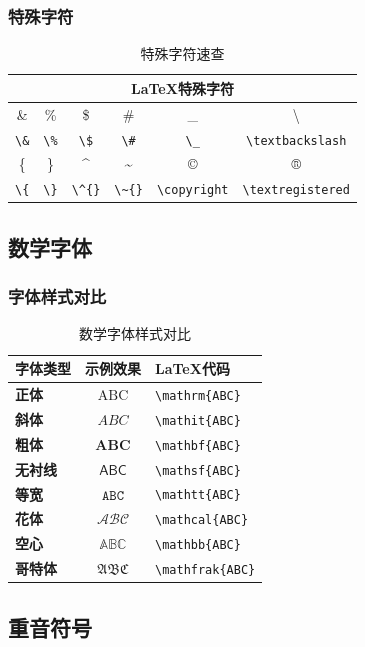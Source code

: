 \documentclass{article}
\begin{document}
\subsubsection{特殊字符}
\begin{table}[H]
\small
\centering
\begin{tabular}{*{6}{c}}
\hline
\multicolumn{6}{c}{\textbf{LaTeX特殊字符}} \\
\hline
\& & \% & \$ & \# & \_ & \textbackslash \\
\verb|\&| & \verb|\%| & \verb|\$| & \verb|\#| & \verb|\_| & \verb|\textbackslash| \\
\hline
\{ & \} & \^{} & \~{} & © & ® \\
\verb|\{| & \verb|\}| & \verb|\^{}| & \verb|\~{}| & \verb|\copyright| & \verb|\textregistered| \\
\hline
\end{tabular}
\caption{特殊字符速查}
\end{table}

\subsection{数学字体}

\subsubsection{字体样式对比}
\begin{table}[H]
\centering
\begin{tabular}{>{\bfseries}l|c|>{\ttfamily}l}
\hline
\textbf{字体类型} & \textbf{示例效果} & \textbf{LaTeX代码} \\
\hline
正体 & $\mathrm{ABC}$ & \verb|\mathrm{ABC}| \\
斜体 & $\mathit{ABC}$ & \verb|\mathit{ABC}| \\
粗体 & $\mathbf{ABC}$ & \verb|\mathbf{ABC}| \\
无衬线 & $\mathsf{ABC}$ & \verb|\mathsf{ABC}| \\
等宽 & $\mathtt{ABC}$ & \verb|\mathtt{ABC}| \\
花体 & $\mathcal{ABC}$ & \verb|\mathcal{ABC}| \\
空心 & $\mathbb{ABC}$ & \verb|\mathbb{ABC}| \\
哥特体 & $\mathfrak{ABC}$ & \verb|\mathfrak{ABC}| \\
\hline
\end{tabular}
\caption{数学字体样式对比}
\end{table}

\subsection{重音符号}
\end{document}
